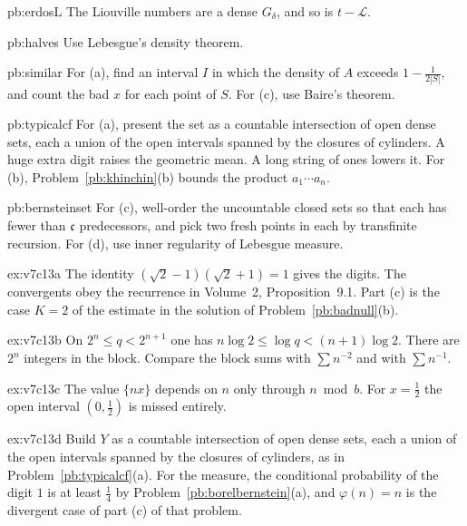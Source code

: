 \begin{hint}{pb:erdosL}
The Liouville numbers are a dense $G_\delta$, and so is $t-\mathcal L$.
\end{hint}

\begin{hint}{pb:halves}
Use Lebesgue's density theorem.
\end{hint}

\begin{hint}{pb:similar}
For (a), find an interval $I$ in which the density of $A$ exceeds $1-\frac1{2|S|}$, and count the bad $x$ for each point of $S$. For (c), use Baire's theorem.
\end{hint}

\begin{hint}{pb:typicalcf}
For (a), present the set as a countable intersection of open dense sets, each a union of the open intervals spanned by the closures of cylinders. A huge extra digit raises the geometric mean. A long string of ones lowers it. For (b), Problem~\ref{pb:khinchin}(b) bounds the product $a_1\cdots a_n$.
\end{hint}

\begin{hint}{pb:bernsteinset}
For (c), well-order the uncountable closed sets so that each has fewer than $\mathfrak c$ predecessors, and pick two fresh points in each by transfinite recursion. For (d), use inner regularity of Lebesgue measure.
\end{hint}

\begin{hint}{ex:v7c13a}
The identity $(\sqrt2-1)(\sqrt2+1)=1$ gives the digits. The convergents obey the recurrence in Volume~2, Proposition~9.1. Part (c) is the case $K=2$ of the estimate in the solution of Problem~\ref{pb:badnull}(b).
\end{hint}

\begin{hint}{ex:v7c13b}
On $2^n\le q<2^{n+1}$ one has $n\log 2\le\log q<(n+1)\log 2$. There are $2^n$ integers in the block. Compare the block sums with $\sum n^{-2}$ and with $\sum n^{-1}$.
\end{hint}

\begin{hint}{ex:v7c13c}
The value $\{nx\}$ depends on $n$ only through $n\bmod b$. For $x=\frac12$ the open interval $(0,\frac12)$ is missed entirely.
\end{hint}

\begin{hint}{ex:v7c13d}
Build $Y$ as a countable intersection of open dense sets, each a union of the open intervals spanned by the closures of cylinders, as in Problem~\ref{pb:typicalcf}(a). For the measure, the conditional probability of the digit $1$ is at least $\frac14$ by Problem~\ref{pb:borelbernstein}(a), and $\varphi(n)=n$ is the divergent case of part (c) of that problem.
\end{hint}

